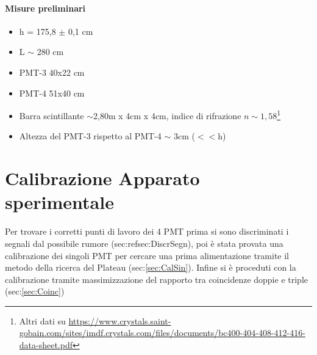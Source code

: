 \documentclass[a4paper]{article}
\begin{document}
\paragraph{Misure preliminari}
\begin{itemize}
\item h = 175,8 $\pm$ 0,1 cm
\item L $\sim$ 280 cm
\item PMT-3 40x22 cm
\item PMT-4 51x40 cm
\item Barra scintillante $\sim$2,80m x 4cm x 4cm, indice di rifrazione $n\sim 1,58$\footnote{Altri dati su \url{https://www.crystals.saint-gobain.com/sites/imdf.crystals.com/files/documents/bc400-404-408-412-416-data-sheet.pdf}}
\item Altezza del PMT-3 rispetto al PMT-4 $\sim$ 3cm ($<<$h)
\end{itemize}

\section{Calibrazione Apparato sperimentale}
Per trovare i corretti punti di lavoro dei 4 PMT prima si sono discriminati i segnali dal possibile rumore (sec:ref{sec:DiscrSegn}), poi è stata provata una calibrazione dei singoli PMT per cercare una prima alimentazione tramite il metodo della ricerca del Plateau (sec:\ref{sec:CalSin}). Infine si è proceduti con la calibrazione tramite massimizzazione del rapporto tra coincidenze doppie e triple (sec:\ref{sec:Coinc})
\end{document}
